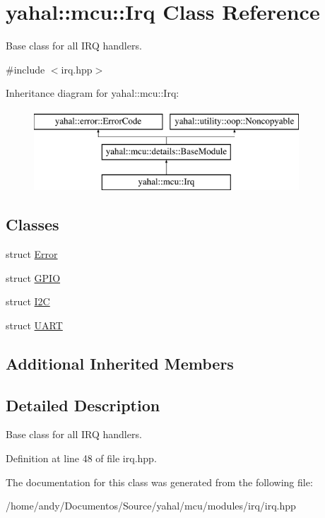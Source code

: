 \hypertarget{classyahal_1_1mcu_1_1_irq}{}\section{yahal\+:\+:mcu\+:\+:Irq Class Reference}
\label{classyahal_1_1mcu_1_1_irq}


Base class for all I\+R\+Q handlers.  




{\ttfamily \#include $<$irq.\+hpp$>$}

Inheritance diagram for yahal\+:\+:mcu\+:\+:Irq\+:\begin{figure}[H]
\begin{center}
\leavevmode
\includegraphics[height=3.000000cm]{classyahal_1_1mcu_1_1_irq}
\end{center}
\end{figure}
\subsection*{Classes}
\begin{DoxyCompactItemize}
\item 
struct \hyperlink{structyahal_1_1mcu_1_1_irq_1_1_error}{Error}
\item 
struct \hyperlink{structyahal_1_1mcu_1_1_irq_1_1_g_p_i_o}{G\+P\+I\+O}
\item 
struct \hyperlink{structyahal_1_1mcu_1_1_irq_1_1_i2_c}{I2\+C}
\item 
struct \hyperlink{structyahal_1_1mcu_1_1_irq_1_1_u_a_r_t}{U\+A\+R\+T}
\end{DoxyCompactItemize}
\subsection*{Additional Inherited Members}


\subsection{Detailed Description}
Base class for all I\+R\+Q handlers. 

Definition at line 48 of file irq.\+hpp.



The documentation for this class was generated from the following file\+:\begin{DoxyCompactItemize}
\item 
/home/andy/\+Documentos/\+Source/yahal/mcu/modules/irq/irq.\+hpp\end{DoxyCompactItemize}
